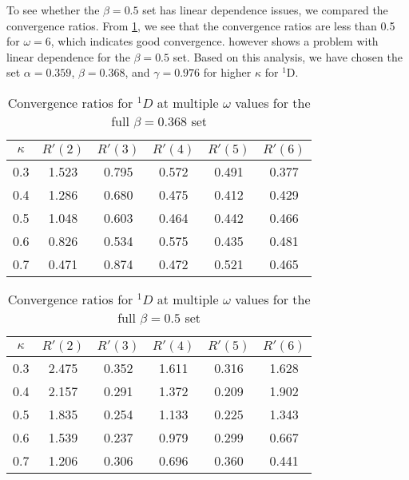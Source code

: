 \documentclass[Dissertation.tex]{subfiles}
\begin{document}
To see whether the $\beta = 0.5$ set has linear dependence issues, we compared
the convergence ratios. From \cref{tab:D1Beta368VarConv}, we see that the
convergence ratios are less than 0.5 for $\omega = 6$, which indicates good
convergence.  however shows a problem with linear
dependence for the $\beta = 0.5$ set. Based on this analysis, we have chosen
the set $\alpha = 0.359$, $\beta = 0.368$, and $\gamma = 0.976$ for higher
$\kappa$ for $^1$D.

\begin{table}
\centering
\begin{tabular}{cccccc}
\toprule
$\kappa$ & $R'(2)$ & $R'(3)$ & $R'(4)$ & $R'(5)$ & $R'(6)$ \\
\midrule
0.3 & 1.523 & 0.795 & 0.572 & 0.491 & 0.377 \\
0.4 & 1.286 & 0.680 & 0.475 & 0.412 & 0.429 \\
0.5 & 1.048 & 0.603 & 0.464 & 0.442 & 0.466 \\
0.6 & 0.826 & 0.534 & 0.575 & 0.435 & 0.481 \\
0.7 & 0.471 & 0.874 & 0.472 & 0.521 & 0.465 \\
\bottomrule
\end{tabular}
\caption{Convergence ratios for $^1D$ at multiple $\omega$ values for the full $\beta = 0.368$ set}
\label{tab:D1Beta368VarConv}
\end{table}


\begin{table}
\centering
\begin{tabular}{cccccc}
\toprule
$\kappa$ & $R'(2)$ & $R'(3)$ & $R'(4)$ & $R'(5)$ & $R'(6)$ \\
\midrule
0.3 & 2.475 & 0.352 & 1.611 & 0.316 & 1.628 \\
0.4 & 2.157 & 0.291 & 1.372 & 0.209 & 1.902 \\
0.5 & 1.835 & 0.254 & 1.133 & 0.225 & 1.343 \\
0.6 & 1.539 & 0.237 & 0.979 & 0.299 & 0.667 \\
0.7 & 1.206 & 0.306 & 0.696 & 0.360 & 0.441 \\
\bottomrule
\end{tabular}
\caption{Convergence ratios for $^1D$ at multiple $\omega$ values for the full $\beta = 0.5$ set}
\label{tab:D1Beta5VarConv}
\end{table}
\end{document}
